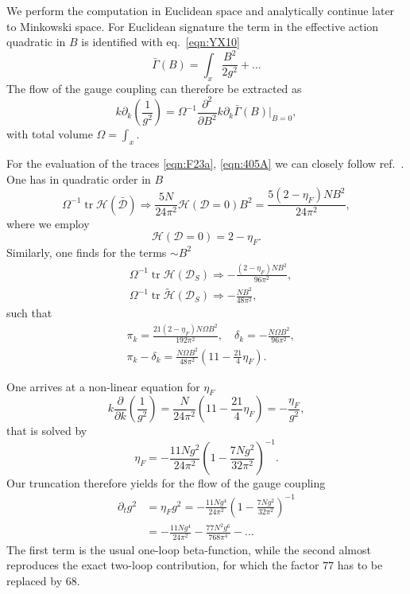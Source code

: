\documentclass[twocolumn,aps,prd,amsmath,amssymb,preprintnumbers,longbibliography]{revtex4-1}
\numberwithin{equation}{section}
\DeclareMathOperator{\tr}{tr}
\newenvironment{alignedeqn}{\begin{equation}\begin{aligned}}{\end{aligned}\end{equation}\ignorespacesafterend}
\begin{document}
We perform the computation in Euclidean space and analytically continue later to Minkowski space. For Euclidean signature the term in the effective action quadratic in $B$ is identified with eq.~\eqref{eqn:YX10}
\begin{equation}\label{eqn:B5}
	\bar\Gamma(B)
	= \int_x \frac{B^2}{2 g^2} + \dots
\end{equation}
The flow of the gauge coupling can therefore be extracted as
\begin{equation}\label{eqn:B6}
	k \partial_k \left(\frac{1}{g^2}\right)
	= \Omega^{-1}
	\frac{\partial^2}{\partial B^2} k \partial_k
	\bar\Gamma(B)|_{B=0},
\end{equation}
with total volume $\Omega = \int_x$.

For the evaluation of the traces \eqref{eqn:F23a}, \eqref{eqn:405A} we can closely follow ref.~\cite{RW}. One has in quadratic order in $B$
\begin{equation}\label{eqn:B7}
	\Omega^{-1}\tr\mathcal{H}(\bar{\mathcal{D}})\Rightarrow
	\frac{5N}{24\pi^2}\mathcal{H}(\mathcal{D}=0) B^2
	= \frac{5(2 - \eta_F)NB^2}{24\pi^2},
\end{equation}
where we employ
\begin{equation}\label{eqn:B8}
	\mathcal{H}(\mathcal{D}=0)
	= 2 - \eta_F.
\end{equation}
Similarly, one finds for the terms $\sim B^2$
\begin{alignedeqn}\label{eqn:B9}
	&\Omega^{-1}\tr\mathcal{H}(\mathcal{D}_S)
	\Rightarrow -\frac{(2 - \eta_F)NB^2}{96\pi^2},\\
	&\Omega^{-1}\tr\tilde{\mathcal{H}}(\mathcal{D}_S)
	\Rightarrow -\frac{NB^2}{48\pi^2},
\end{alignedeqn}
such that
\begin{alignedeqn}\label{eqn:B10}
	&\pi_k
	= \frac{21(2 - \eta_F)N\Omega B^2}{192\pi^2},
	\quad
	\delta_k
	= -\frac{N\Omega B^2}{96\pi^2},\\
	&\pi_k - \delta_k
	= \frac{N\Omega B^2}{48\pi^2}
	\left(11 - \frac{21}{4}\eta_F\right).
\end{alignedeqn}


One arrives at a non-linear equation for $\eta_F$
\begin{equation}\label{eqn:B10a}
	k\frac{\partial}{\partial k}
	\left(\frac{1}{g^2}\right)
	= \frac{N}{24\pi^2}
	\left(11 - \frac{21}{4}\eta_F\right)
	= -\frac{\eta_F}{g^2},
\end{equation}
that is solved by
\begin{equation}\label{eqn:B11}
	\eta_F
	= -\frac{11 Ng^2}{24 \pi^2}
	\left(1 - \frac{7 Ng^2}{32 \pi^2}\right)^{-1}.
\end{equation}
Our truncation therefore yields for the flow of the gauge coupling
\begin{alignedeqn}\label{eqn:B12}
	\partial_tg^2
	&= \eta_Fg^2
	= -\frac{11 Ng^4}{24 \pi^2}
	\left(1 - \frac{7 Ng^2}{32 \pi^2}\right)^{-1}\\
	&= -\frac{11 Ng^4}{24 \pi^2} - \frac{77 N^2 g^6}{768 \pi^4} - \dots
\end{alignedeqn}
The first term is the usual one-loop beta-function, while the second almost reproduces the exact two-loop contribution, for which the factor $77$ has to be replaced by $68$.
\end{document}
